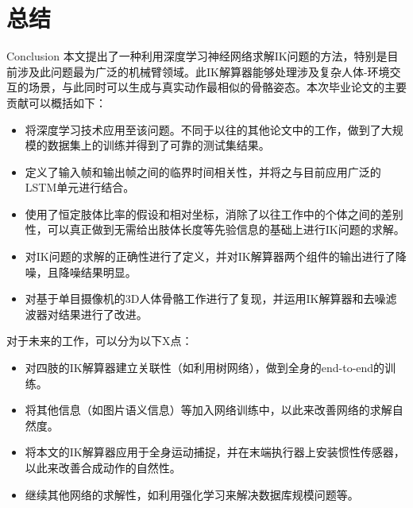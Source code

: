 \chapter{总结}{Conclusion}
本文提出了一种利用深度学习神经网络求解IK问题的方法，特别是目前涉及此问题最为广泛的机械臂领域。此IK解算器能够处理涉及复杂人体-环境交互的场景，与此同时可以生成与真实动作最相似的骨骼姿态。本次毕业论文的主要贡献可以概括如下：
\begin{itemize}
  \item 将深度学习技术应用至该问题。不同于以往的其他论文中的工作，做到了大规模的数据集上的训练并得到了可靠的测试集结果。
  \item 定义了输入帧和输出帧之间的临界时间相关性，并将之与目前应用广泛的LSTM单元进行结合。
  \item 使用了恒定肢体比率的假设和相对坐标，消除了以往工作中的个体之间的差别性，可以真正做到无需给出肢体长度等先验信息的基础上进行IK问题的求解。
  \item 对IK问题的求解的正确性进行了定义，并对IK解算器两个组件的输出进行了降噪，且降噪结果明显。
  \item 对基于单目摄像机的3D人体骨骼工作进行了复现，并运用IK解算器和去噪滤波器对结果进行了改进。
\end{itemize}

对于未来的工作，可以分为以下X点：
\begin{itemize}
  \item 对四肢的IK解算器建立关联性（如利用树网络），做到全身的end-to-end的训练。
  \item 将其他信息（如图片语义信息）等加入网络训练中，以此来改善网络的求解自然度。
  \item 将本文的IK解算器应用于全身运动捕捉，并在末端执行器上安装惯性传感器，以此来改善合成动作的自然性。
  \item 继续其他网络的求解性，如利用强化学习来解决数据库规模问题等。
\end{itemize}
